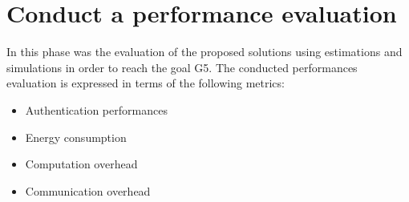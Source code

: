 \section{Conduct a performance evaluation}
In this phase was the evaluation of the proposed solutions using estimations and simulations in order to reach the goal G5.
The conducted performances evaluation is expressed in terms of the following metrics: 
\begin{itemize}
    \item Authentication performances
    \item Energy consumption 
    \item Computation overhead 
    \item Communication overhead
\end{itemize}




